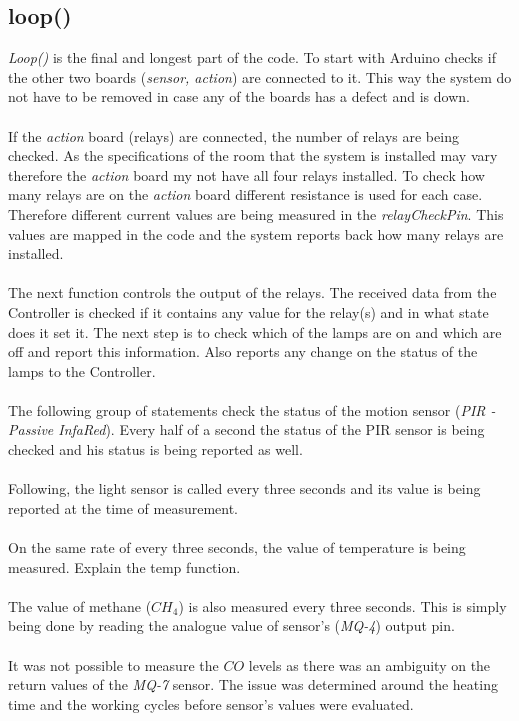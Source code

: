\documentclass[12pt,a4paper,draft]{report}
\begin{document}
\subsection{loop()}
\textit{Loop()} is the final and longest part of the code. To start with Arduino checks if the other two boards (\textit{sensor, action}) are connected to it. This way the system do not have to be removed in case any of the boards has a defect and is down.\\
\ \\
If the \textit{action} board (relays) are connected, the number of relays are being checked. As the specifications of the room that the system is installed may vary therefore the \textit{action} board my not have all four relays installed. To check how many relays are on the \textit{action} board different resistance is used for each case. Therefore different current values are being measured in the \textit{relayCheckPin}. This values are mapped in the code and the system reports back how many relays are installed.\\
\ \\
The next function controls the output of the relays. The received data from the Controller is checked if it contains any value for the relay(s) and in what state does it set it. The next step is to check which of the lamps are on and which are off and report this information. Also reports any change on the status of the lamps to the Controller. \\
\ \\
The following group of statements check the status of the motion sensor (\textit{PIR - Passive InfaRed}). Every half of a second the status of the PIR sensor is being checked and his status is being reported as well.\\
\ \\
Following, the light sensor is called every three seconds and its value is being reported at the time of measurement.\\
\ \\
On the same rate of every three seconds, the value of temperature is being measured. Explain the temp function. \\
\ \\
The value of methane ($CH_4$) is also measured every three seconds. This is simply being done by reading the analogue value of sensor's (\textit{MQ-4}) output pin.\\
\ \\
It was not possible to measure the $CO$ levels as there was an ambiguity on the return values of the \textit{MQ-7} sensor. The issue was determined around the heating time and the working cycles before sensor's values were evaluated.\\
\ \\
%
\end{document}
